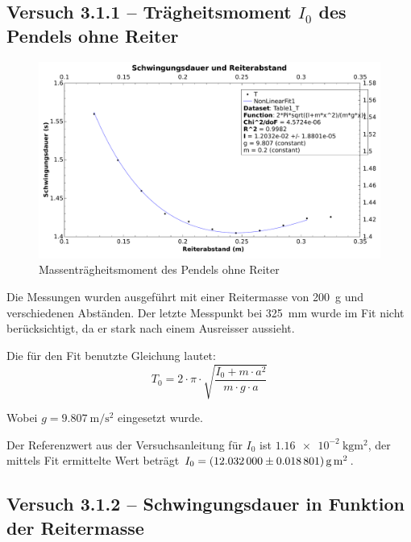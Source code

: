 \subsection{Versuch 3.1.1 -- Tr\"agheitsmoment $I_0$ des Pendels ohne Reiter}
\label{subsec:i0}

\begin{figure}[h!]
    \centering
    \includegraphics[width=\textwidth]{images/311.pdf}
    \caption{%
        Massentr\"agheitsmoment des Pendels ohne Reiter
    }
    \label{fig:pendelKonfigs}
\end{figure}

Die Messungen  wurden ausgef\"uhrt  mit einer Reitermasse  von \SI{200}{\gram}
und verschiedenen Abst\"anden. Der letzte Messpunkt bei \SI{325}{\milli\meter}
wurde  im  Fit nicht  ber\"ucksichtigt,  da  er  stark nach  einem  Ausreisser
aussieht.

Die f\"ur den Fit benutzte Gleichung lautet:
\begin{equation}
    T_0 = 2 \cdot \pi \cdot \sqrt{\frac{I_0 + m \cdot a^2}{m \cdot g \cdot a}}
\end{equation}

Wobei $g = \SI{9.807}{\meter\per\second\squared}$ eingesetzt wurde.

Der Referenzwert aus der Versuchsanleitung f\"ur $I_0$ ist $\SI{1.16e-2}{\kilo\gram\meter\squared}$,
der mittels Fit ermittelte Wert betr\"agt $I_0  = \SI[separate-uncertainty = true]{12.032 \pm 0.018801}{\gram\meter\squared}$.


\clearpage
\subsection{Versuch 3.1.2 -- Schwingungsdauer in Funktion der Reitermasse}
\label{subsec:periodeReitermasse}

